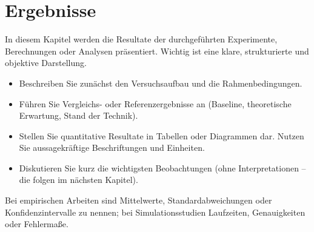  \chapter{Ergebnisse}\label{ch:ergebnisse}

In diesem Kapitel werden die Resultate der durchgeführten Experimente, Berechnungen oder Analysen präsentiert.
Wichtig ist eine klare, strukturierte und objektive Darstellung.

\begin{itemize}
\item Beschreiben Sie zunächst den Versuchsaufbau und die Rahmenbedingungen.
\item Führen Sie Vergleichs- oder Referenzergebnisse an (Baseline, theoretische Erwartung, Stand der Technik).
\item Stellen Sie quantitative Resultate in Tabellen oder Diagrammen dar. Nutzen Sie aussagekräftige Beschriftungen und Einheiten.
\item Diskutieren Sie kurz die wichtigsten Beobachtungen (ohne Interpretationen – die folgen im nächsten Kapitel).
\end{itemize}

Bei empirischen Arbeiten sind Mittelwerte, Standardabweichungen oder Konfidenzintervalle zu nennen; bei Simulationsstudien Laufzeiten, Genauigkeiten oder Fehlermaße.


